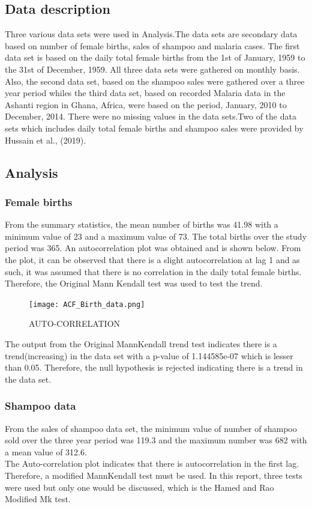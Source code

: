 \documentclass[12pt, letterpaper, twoside]{article}
\begin{document}
\subsection{Data description}
Three various data sets were used in Analysis.The data sets are secondary data based on number of female births, sales of shampoo and malaria cases. The first data set is based on the daily total female births from the 1st of January, 1959 to the 31st of December, 1959. All three data sets were gathered on monthly basis. Also, the second data set, based on the shampoo sales were gathered over a three year period whiles the third data set, based on recorded Malaria data in the Ashanti region in Ghana, Africa, were based on the period, January, 2010 to December, 2014. There were no missing values in the data sets.Two of the data sets which includes daily total female births and shampoo sales were provided by Hussain et al., (2019).
\subsection{Analysis}
\subsubsection{Female births}
From the summary statistics, the mean number of births was 41.98 with a minimum value of 23 and a maximum value of 73. The total births over the study period was 365. An autocorrelation plot was obtained and is shown below. From the plot, it can be observed that there is a slight autocorrelation at lag 1 and as such, it was assumed that there is no correlation in the daily total female births. Therefore, the Original Mann Kendall test was used to test the trend.\\

\begin{figure}
    \centering
    \texttt{[image: ACF\_Birth\_data.png]}
    \caption{AUTO-CORRELATION}
    \label{fig:my_label}
\end{figure}


The output from the Original MannKendall trend test indicates there is a trend(increasing) in the data set with a p-value of 1.144585e-07 which is lesser than 0.05. Therefore, the null hypothesis is rejected indicating there is a trend in the data set. 

\subsubsection{Shampoo data}
From the sales of shampoo data set, the minimum value of number of shampoo sold over the three year period was 119.3 and the maximum number was 682 with a mean value of 312.6.\\
The Auto-correlation plot indicates that there is autocorrelation in the first lag. Therefore, a modified MannKendall test must be used. In this report, three tests were used but only one would be discussed, which is the Hamed and Rao Modified Mk test.
\end{document}
